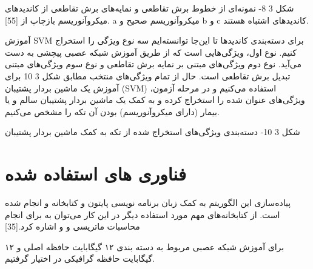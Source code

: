  
شکل ‏3 8- نمونه‌ای از خطوط برش تقاطعی و نمایه‌های برش تقاطعی از کاندید‌های میکروآنوریسم بازچاپ از [55]. a میکروآنوریسم صحیح و b و c کاندید‌های اشتباه هستند.

	آموزش SVM برای دسته‌بندی کاندیدها
تا این‌جا توانسته‌ایم سه نوع ویژگی را استخراج کنیم. نوع اول، ویژگی‌هایی است که از طریق آموزش شبکه عصبی پیچشی به دست می‌آید. نوع دوم ویژگی‌های مبتنی بر نمایه برش تقاطعی و نوع سوم ویژگی‌های مبتنی تبدیل برش تقاطعی است. حال از تمام ویژگی‌های منتخب مطابق شکل ‏3 10 برای آموزش یک ماشین بردار پشتیبان (SVM) استفاده می‌کنیم و در مرحله آزمون، ویژگی‌های عنوان شده را استخراج کرده و به کمک یک ماشین بردار پشتیبان سالم و یا بیمار (دارای میکروآنوریسم) بودن آن تکه را مشخص می‌کنیم. 
 
شکل ‏3 10- دسته‌بندی ویژگی‌های استخراج شده از تکه به کمک ماشین بردار پشتیبان

\section{فناوری های استفاده شده}
پیاده‌سازی این الگوریتم به کمک زبان برنامه‌ نویسی پایتون و کتابخانه  و انجام شده است. از کتابخانه‌های مهم مورد استفاده دیگر در این کار می‌‌توان به  برای انجام محاسبات ماتریسی و  و  اشاره کرد.[35] 

برای آموزش شبکه عصبی مربوط به دسته بندی ۱۲ گیگابایت حافظه اصلی و ۱۲ گیگابایت حافظه گرافیکی در اختیار گرفتیم.

